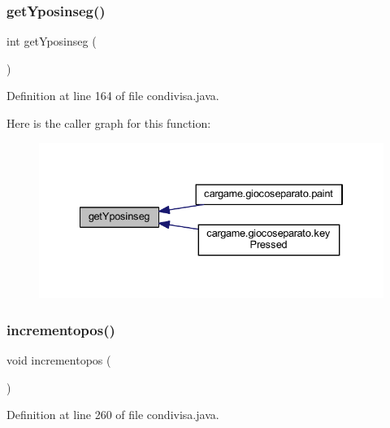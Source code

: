 \subsubsection{\texorpdfstring{get\+Yposinseg()}{getYposinseg()}}
{\footnotesize\ttfamily int get\+Yposinseg (\begin{DoxyParamCaption}{ }\end{DoxyParamCaption})}



Definition at line 164 of file condivisa.\+java.

Here is the caller graph for this function\+:
\nopagebreak
\begin{figure}[H]
\begin{center}
\leavevmode
\includegraphics[width=334pt]{classcargame_1_1condivisa_a0db1c898200d64b881a2657712f72e40_icgraph}
\end{center}
\end{figure}
\mbox{\label{classcargame_1_1condivisa_a67792a3a709b780ba197a7a90146235f}} 
\subsubsection{\texorpdfstring{incrementopos()}{incrementopos()}}
{\footnotesize\ttfamily void incrementopos (\begin{DoxyParamCaption}{ }\end{DoxyParamCaption})}



Definition at line 260 of file condivisa.\+java.

